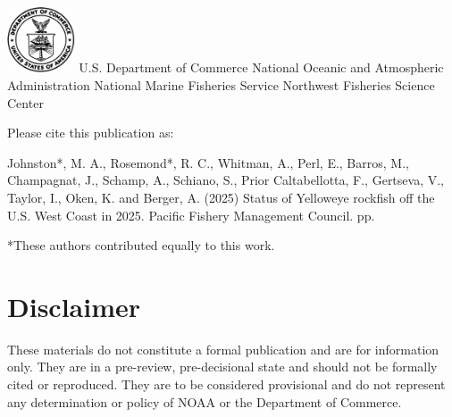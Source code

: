 \documentclass[
]{scrartcl}
\renewcommand*\contentsname{Table of contents}
\newcommand\contentsname{Table of contents}
\begin{document}
\begin{titlepage}
\begin{minipage}[b][\textheight][s]{\textwidth}
  \includegraphics[alt={},width=2cm]{support_files/us_doc_logo.png}\newline %
  U.S. Department of Commerce\newline
  National Oceanic and Atmospheric Administration\newline
  National Marine Fisheries Service\newline
  Northwest Fisheries Science Center\newline

  \end{minipage}
  \restoregeometry
  \end{titlepage}

\renewcommand*\contentsname{Table of contents}
{
\hypersetup{linkcolor=}
\setcounter{tocdepth}{3}
\tableofcontents
}

\setcounter{page}{1}

\renewcommand{\thetable}{\roman{table}}
\renewcommand{\thefigure}{\roman{figure}}

\newpage{}

Please cite this publication as:

Johnston*, M. A., Rosemond*, R. C., Whitman, A., Perl, E., Barros, M.,
Champagnat, J., Schamp, A., Schiano, S., Prior Caltabellotta, F.,
Gertseva, V., Taylor, I., Oken, K. and Berger, A. (2025) Status of
Yelloweye rockfish off the U.S. West Coast in 2025. Pacific Fishery
Management Council. \pageref*{LastPage}{} pp.

*These authors contributed equally to this work.

\newpage{}

\setcounter{page}{1}

\renewcommand{\thetable}{\roman{table}}
\renewcommand{\thefigure}{\roman{figure}}

\section*{Disclaimer}\label{disclaimer}

These materials do not constitute a formal publication and are for
information only. They are in a pre-review, pre-decisional state and
should not be formally cited or reproduced. They are to be considered
provisional and do not represent any determination or policy of NOAA or
the Department of Commerce.
\end{document}
